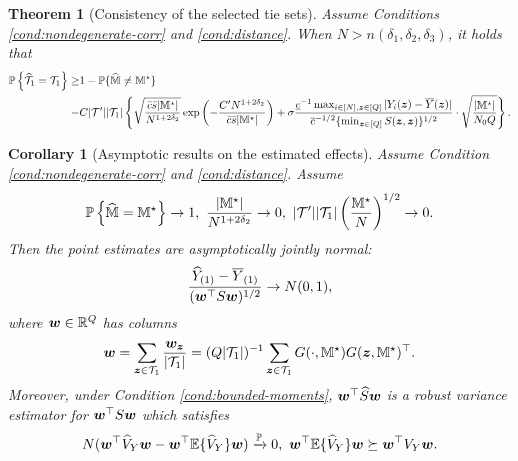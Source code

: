 \documentclass[12pt]{article}
\newtheorem{theorem}{Theorem}
\newtheorem{remark}{Remark}
\newtheorem{corollary}{Corollary}
\begin{document}
\begin{theorem}[Consistency of the selected tie sets]\label{thm:wt-converge}
Assume Conditions \ref{cond:nondegenerate-corr} and \ref{cond:distance}.  When $N>n(\delta_1,\delta_2,\delta_3)$, it holds that
\begin{align*}
   {\mathbb{P}}\left\{\widehat{{\mathcal{T}}}_{1} = {{\mathcal{T}}}_{1} \right\} 
   \ge&  1 - {\mathbb{P}}\{\widehat{{\mathbb{M}}}\neq {\mathbb{M}}^\star\}\\
    -& C|{\mathcal{T}}'||{\mathcal{T}}_{1}|\left\{\sqrt{\frac{\bar{c}\bar{s}|{\mathbb{M}}^\star|}{N^{1+2\delta_2}}}\exp\left(-\frac{C'N^{1+2\delta_2}}{\bar{c}\bar{s}|{\mathbb{M}}^\star|}\right)+\sigma   \frac{ \underline{c}^{-1} \max_{i\in[N],{\boldsymbol{z}}\in[Q]}|Y_i({\boldsymbol{z}})-\overline{Y}({\boldsymbol{z}})|}{ {\overline{c}^{-1/2} \{\min_{{\boldsymbol{z}}\in[Q]} S({\boldsymbol{z}},{\boldsymbol{z}})}\}^{1/2}}\cdot \sqrt{\frac{|{\mathbb{M}}^\star|}{N_0Q}}\right\}.
\end{align*}


\end{theorem}






\begin{corollary}[Asymptotic results on the estimated effects]\label{cor:infer-order}
Assume Condition \ref{cond:nondegenerate-corr} and \ref{cond:distance}. Assume
\begin{align*}
  {{\mathbb{P}}\left\{\widehat{{\mathbb{M}}} = {\mathbb{M}}^\star\right\}} \to 1, ~ \frac{|{\mathbb{M}}^\star|}{N^{1+2\delta_2}}\to 0, ~|{\mathcal{T}}'||{\mathcal{T}}_1|\left(\frac{{\mathbb{M}}^\star}{N}\right)^{1/2} \to 0.
\end{align*}
Then the point estimates are asymptotically jointly normal:
\begin{align*}
      \frac{ {\widehat{Y}}_{(1)}  -   \overline{Y}_{(1)}}{({\boldsymbol{w}}^\top S {\boldsymbol{w}})^{1/2}} \to N(0, 1), 
\end{align*}
where ${\boldsymbol{w}}\in{\mathbb{R}}^{Q}$ has columns
\begin{align*}
    {\boldsymbol{w}} = \sum_{{\boldsymbol{z}}\in {{\mathcal{T}}}_{1}}\frac{{{\boldsymbol{w}}}_{{\boldsymbol{z}}}}{|{{\mathcal{T}}}_{1}|} = (Q|{{\mathcal{T}}}_{1}|)^{-1}\sum_{{\boldsymbol{z}}\in {{\mathcal{T}}}_{1}}G(\cdot,{{\mathbb{M}}^\star}) G({{\boldsymbol{z}}, {\mathbb{M}}^\star})^\top .
\end{align*}
Moreover, under Condition \ref{cond:bounded-moments}, ${\boldsymbol{w}}^\top \widehat{S} {\boldsymbol{w}}$ is a robust variance estimator for ${\boldsymbol{w}}^\top S {\boldsymbol{w}} $ which satisfies
\begin{align*}
    {N} ({\boldsymbol{w}}^\top \widehat{V}_Y {\boldsymbol{w}} - {\boldsymbol{w}}^\top {\mathbb{E}}\{{\widehat{V}}_Y\}{\boldsymbol{w}})\xrightarrow{{\mathbb{P}}} 0,  ~ {\boldsymbol{w}}^\top {\mathbb{E}}\{{\widehat{V}}_Y\} {\boldsymbol{w}} \succeq {\boldsymbol{w}}^\top V_Y {\boldsymbol{w}}.
\end{align*}

\end{corollary}
\end{document}
